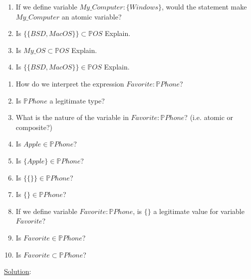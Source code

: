 \documentclass[12pt]{article}
\begin{document}
\begin{itemize}
\begin{enumerate}
                  \item If we define variable $My\_Computer : \{Windows\}$, would the statement make $My\_Computer$ an atomic variable?
                  
                  \item Is $\{\{BSD, MacOS\}\} \subset \mathbb{P} OS$ Explain.
                  
                  \item Is $My\_OS \subset \mathbb{P} OS$ Explain.
                  
                  \item Is $\{\{BSD, MacOS\}\} \in \mathbb{P} OS$ Explain.
            \end{enumerate}
            \newpage
            \begin{enumerate}

                  \item How do we interpret the expression $Favorite : \mathbb{P} Phone$?

                  \item Is $\mathbb{P} Phone$ a legitimate type?

                  \item What is the nature of the variable in $Favorite : \mathbb{P} Phone$? (i.e. atomic or composite?)

                  \item Is $Apple \in \mathbb{P} Phone$?

                  \item Is $\{ Apple \} \in \mathbb{P} Phone$?

                  \item Is $\{ \{ \} \} \in \mathbb{P} Phone$?

                  \item Is $\{ \} \in \mathbb{P} Phone$?

                  \item If we define variable $Favorite : \mathbb{P} Phone$, is $\{ \}$ a legitimate value for variable $Favorite$?

                  \item Is $Favorite \in \mathbb{P} Phone$?

                  \item Is $Favorite \subset \mathbb{P} Phone$?

            \end{enumerate}

            \noindent \underline{Solution}:


\end{itemize}
\end{document}
